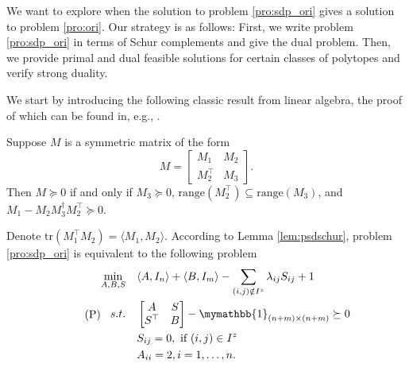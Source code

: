\documentclass[smallextended, envcountsame]{svjour3}
\begin{document}
    We want to explore when the solution to problem \eqref{pro:sdp_ori} gives a solution to problem \eqref{pro:ori}.  Our strategy is as follows: First, we write problem \eqref{pro:sdp_ori} in terms of Schur complements and give the dual problem.  Then, we provide primal and dual feasible solutions for certain classes of polytopes and verify strong duality.
    
    We start by introducing the following classic result from linear algebra, the proof of which can be found in, e.g., \cite{boyd2004convex,lemon2016low}.
    \begin{lemma}\label{lem:psdschur}
        Suppose $M$ is a symmetric matrix of the form
        \begin{equation*}
            M=
            \begin{bmatrix}
                M_1 & M_2\\
                M_2^\top & M_3
            \end{bmatrix}.
        \end{equation*}
        Then $M\succeq 0$ if and only if $M_3\succeq 0$, $\mathrm{range}(M_2^\top)\subseteq\mathrm{range}(M_3)$, and $M_1-M_2 M_3^\dagger M_2^\top\succeq 0$.
    \end{lemma}
    
    Denote $\mathrm{tr}(M_1^\top M_2)=\langle M_1, M_2\rangle$.  According to Lemma \ref{lem:psdschur}, problem \eqref{pro:sdp_ori} is equivalent to the following problem
    \begin{align}\label{pro:sdp_primal}\tag{P}
    \begin{split}
        \min_{A,B,S}~~~&\langle A, I_n\rangle + \langle B, I_m\rangle - \sum_{(i,j)\notin I^z}\lambda_{ij}S_{ij} + 1\\
        s.t.~~~& 
        \begin{bmatrix}
            A & S\\
            S^\top & B
        \end{bmatrix} - \mymathbb{1}_{(n+m)\times (n+m)}\succeq 0\\
        & S_{ij} = 0,~\text{if}~(i,j)\in I^z\\
        & A_{ii} = 2, i = 1,\ldots,n.
    \end{split}
    \end{align}
    
\end{document}
